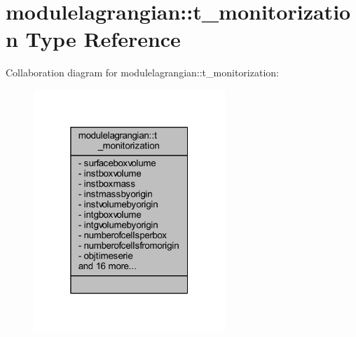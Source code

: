 \hypertarget{structmodulelagrangian_1_1t__monitorization}{}\section{modulelagrangian\+:\+:t\+\_\+monitorization Type Reference}
\label{structmodulelagrangian_1_1t__monitorization}


Collaboration diagram for modulelagrangian\+:\+:t\+\_\+monitorization\+:\nopagebreak
\begin{figure}[H]
\begin{center}
\leavevmode
\includegraphics[width=205pt]{structmodulelagrangian_1_1t__monitorization__coll__graph}
\end{center}
\end{figure}
